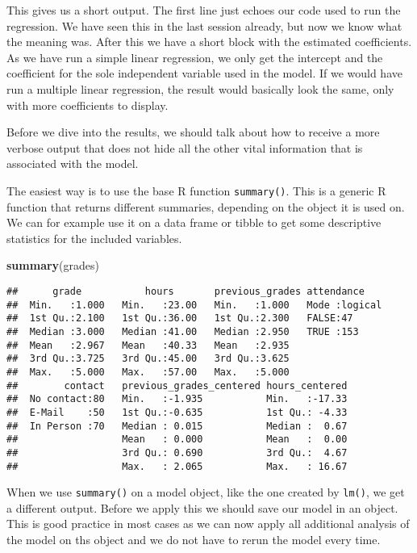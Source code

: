 \documentclass[
]{book}
\newenvironment{Shaded}{\begin{snugshade}}{\end{snugshade}}
\newcommand{\FunctionTok}[1]{\textcolor[rgb]{0.13,0.29,0.53}{\textbf{#1}}}
\newcommand{\NormalTok}[1]{#1}
\begin{document}
This gives us a short output. The first line just echoes our code used to run
the regression. We have seen this in the last session already, but now we know
what the meaning was. After this we have a short block with the estimated
coefficients. As we have run a simple linear regression, we only get the
intercept and the coefficient for the sole independent variable used in the
model. If we would have run a multiple linear regression, the result would
basically look the same, only with more coefficients to display.

Before we dive into the results, we should talk about how to receive a more
verbose output that does not hide all the other vital information that is
associated with the model.

The easiest way is to use the base R function \texttt{summary()}. This is a generic R
function that returns different summaries, depending on the object it is used
on. We can for example use it on a data frame or tibble to get some descriptive
statistics for the included variables.

\begin{Shaded}
\begin{Highlighting}[]
\FunctionTok{summary}\NormalTok{(grades)}
\end{Highlighting}
\end{Shaded}

\begin{verbatim}
##      grade           hours       previous_grades attendance     
##  Min.   :1.000   Min.   :23.00   Min.   :1.000   Mode :logical  
##  1st Qu.:2.100   1st Qu.:36.00   1st Qu.:2.300   FALSE:47       
##  Median :3.000   Median :41.00   Median :2.950   TRUE :153      
##  Mean   :2.967   Mean   :40.33   Mean   :2.935                  
##  3rd Qu.:3.725   3rd Qu.:45.00   3rd Qu.:3.625                  
##  Max.   :5.000   Max.   :57.00   Max.   :5.000                  
##        contact   previous_grades_centered hours_centered  
##  No contact:80   Min.   :-1.935           Min.   :-17.33  
##  E-Mail    :50   1st Qu.:-0.635           1st Qu.: -4.33  
##  In Person :70   Median : 0.015           Median :  0.67  
##                  Mean   : 0.000           Mean   :  0.00  
##                  3rd Qu.: 0.690           3rd Qu.:  4.67  
##                  Max.   : 2.065           Max.   : 16.67
\end{verbatim}

When we use \texttt{summary()} on a model object, like the one created by \texttt{lm()}, we
get a different output. Before we apply this we should save our model in an
object. This is good practice in most cases as we can now apply all additional
analysis of the model on ths object and we do not have to rerun the model
every time.
\end{document}
